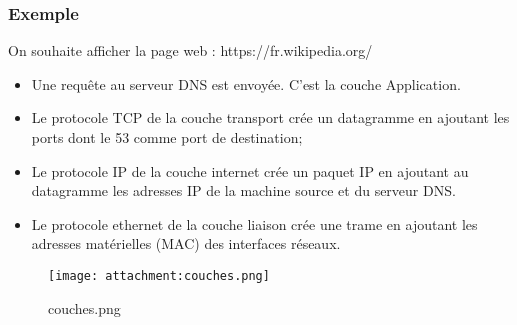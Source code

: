 \documentclass[11pt]{article}
\providecommand{\tightlist}{%
      \setlength{\itemsep}{0pt}\setlength{\parskip}{0pt}}
\begin{document}
\hypertarget{exemple}{%
\subsubsection{Exemple}\label{exemple}}

On souhaite afficher la page web : https://fr.wikipedia.org/

\begin{itemize}
\tightlist
\item
  Une requête au serveur DNS est envoyée. C'est la couche Application.
\item
  Le protocole TCP de la couche transport crée un datagramme en ajoutant
  les ports dont le 53 comme port de destination;
\item
  Le protocole IP de la couche internet crée un paquet IP en ajoutant au
  datagramme les adresses IP de la machine source et du serveur DNS.
\item
  Le protocole ethernet de la couche liaison crée une trame en ajoutant
  les adresses matérielles (MAC) des interfaces réseaux.
\end{itemize}

    \begin{figure}
\centering
\texttt{[image: attachment:couches.png]}
\caption{couches.png}
\end{figure}


    
    
    
\end{document}
